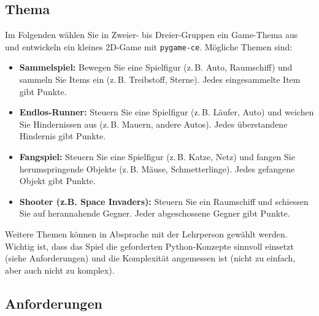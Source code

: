 \subsection{Thema}
Im Folgenden wählen Sie in Zweier- bis Dreier-Gruppen ein Game-Thema aus und entwickeln ein kleines 2D-Game mit \texttt{pygame-ce}. Mögliche Themen sind:
\begin{itemize}
    \item \textbf{Sammelspiel:} Bewegen Sie eine Spielfigur (z.\,B. Auto, Raumschiff) und sammeln Sie Items ein (z.\,B. Treibstoff, Sterne). Jedes eingesammelte Item gibt Punkte.
    \item \textbf{Endlos-Runner:} Steuern Sie eine Spielfigur (z.\,B. Läufer, Auto) und weichen Sie Hindernissen aus (z.\,B. Mauern, andere Autos). Jedes überstandene Hindernis gibt Punkte.
    \item \textbf{Fangspiel:} Steuern Sie eine Spielfigur (z.\,B. Katze, Netz) und fangen Sie herumspringende Objekte (z.\,B. Mäuse, Schmetterlinge). Jedes gefangene Objekt gibt Punkte.
    \item \textbf{Shooter (z.B. Space Invaders):} Steuern Sie ein Raumschiff und schiessen Sie auf herannahende Gegner. Jeder abgeschossene Gegner gibt Punkte.
\end{itemize}

Weitere Themen können in Absprache mit der Lehrperson gewählt werden. Wichtig ist, dass das Spiel die geforderten Python-Konzepte sinnvoll einsetzt (siehe Anforderungen) und die Komplexität angemessen ist (nicht zu einfach, aber auch nicht zu komplex).

\subsection{Anforderungen}

